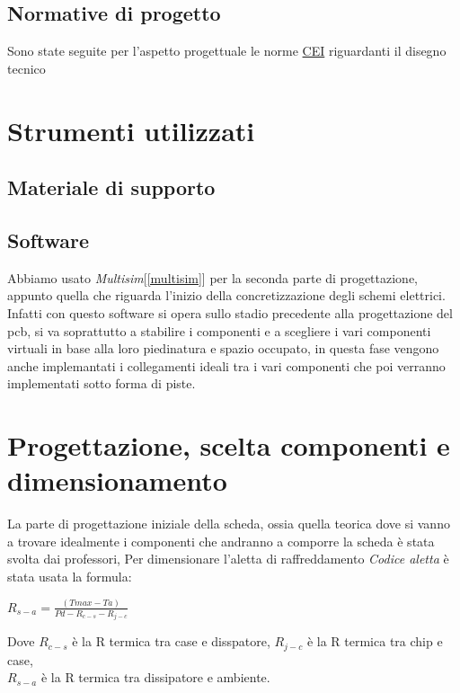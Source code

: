 \documentclass{article}
\begin{document}
\subsection{Normative di progetto}
Sono state seguite per l'aspetto progettuale le norme \href{https://my.ceinorme.it/home.html}{CEI} riguardanti il disegno tecnico
\section{Strumenti utilizzati}
\subsection{Materiale di supporto}
\subsection{Software}
Abbiamo usato \textit{Multisim}[\ref{multisim}] per la seconda parte di progettazione, appunto quella che riguarda l'inizio della concretizzazione
degli schemi elettrici.\\
Infatti con questo software si opera sullo stadio precedente alla progettazione del pcb, si va soprattutto a stabilire i componenti e a scegliere i vari componenti virtuali
in base alla loro piedinatura e spazio occupato, in questa fase vengono anche implemantati i collegamenti ideali tra i vari componenti che poi verranno implementati sotto forma di piste. 
\section{Progettazione, scelta componenti e dimensionamento}
La parte di progettazione iniziale della scheda, ossia quella teorica dove si vanno a trovare idealmente i componenti che andranno a comporre la scheda è stata svolta dai professori,
Per dimensionare l'aletta di raffreddamento \textit{Codice aletta} è stata usata la formula:

\begin{center}
$R_{s-a}=\frac{(Tmax-Ta)}{Pd-R_{c-s}-R_{j-c}}$\\
\end{center}
Dove \textit{$R_{c-s}$} è la R termica tra case e disspatore, \textit{$R_{j-c}$} è la R termica tra chip e case,\\ \textit{$R_{s-a}$} è la R termica tra dissipatore e ambiente.\\
\end{document}
